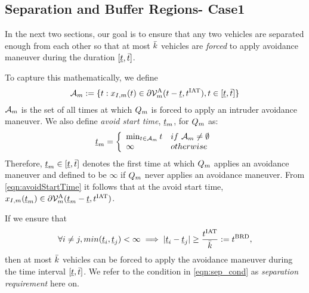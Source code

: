\subsection{Separation and Buffer Regions- Case1} \label{sec:case1}
In the next two sections, our goal is to ensure that any two vehicles are separated enough from each other so that %
at most $\bar{k}$ vehicles are \textit{forced} to apply avoidance maneuver during the duration $[\underline{t}, \bar{t}]$. 

To capture this mathematically, we define 
\begin{equation} \label{eqn:avoidStartTime}
\avoidt_{m} := \{t: \state_{\intr,m}(t) \in \partial\brs^{\text{A}}_{m}(t-\tsa, \iat), t \in [\tsa, \tea]\}
\end{equation} 
$\mathcal{A}_{m}$ is the set of all times at which $Q_m$ is forced to apply an intruder avoidance maneuver. We also define \textit{avoid start time}, $\underline{t}_m$, for $Q_m$ as:
\begin{equation}
\underline{t}_m  = 
\left \{ 
\begin{array}{ll}
\min_{t \in  \mathcal{A}_{m}} t & \relax{if~} \mathcal{A}_{m} \neq \emptyset\\
\infty & \relax{otherwise}
\end{array}
\right.
\end{equation}  
Therefore, $\underline{t}_m \in [\underline{t}, \bar{t}]$ denotes the first time at which $Q_m$ applies an avoidance maneuver and defined to be $\infty$ if $Q_m$ never applies an avoidance maneuver. From \eqref{eqn:avoidStartTime} it follows that at the avoid start time, $x_{I,m}(\underline{t}_m) \in  \partial\mathcal{V}^{\text{A}}_{m}(\underline{t}_m-\underline{t}, t^\text{IAT})$. %
 
If we ensure that 
\begin{equation} \label{eqn:sep_cond}
\forall i \neq j, min(\tsa_i, \tsa_j)< \infty \implies |\tsa_i - \tsa_j| \geq \frac{\iat}{\nva} := \brd,
\end{equation}
then at most $\bar{k}$ vehicles can be forced to apply the avoidance maneuver during the time interval $[\underline{t}, \bar{t}]$. We refer to the condition in \eqref{eqn:sep_cond} as \textit{separation requirement} here on. 

